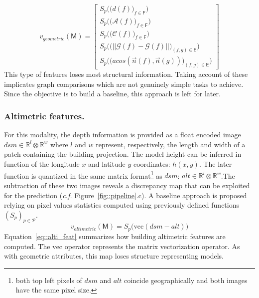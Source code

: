 \documentclass[runningheads]{llncs}
\begin{document}
\begin{equation}
	\label{eq::geom_feat}
    v_{geometric}(\mathsf{M}) = \begin{bmatrix}
    	S_p \Big(\big(d(f)\big)_{f \in \mathsf{F}}\Big)\\
    	S_p \Big(\big(\mathscr{A}(f)\big)_{f \in \mathsf{F}}\Big)\\
    	S_p \Big(\big(\mathscr{C}(f)\big)_{f \in \mathsf{F}}\Big)\\
    	S_p \Big(\big( \vert\vert \mathscr{G}(f) - \mathscr{G}(f) \vert\vert \big)_{(f,g) \in \mathsf{E}}\Big)\\
    	S_p \Big(\big( acos(\vec{n}(f), \vec{n}(g)) \big)_{(f,g) \in \mathsf{E}}\Big)
    \end{bmatrix}
\end{equation}
This type of features loses most structural information. Taking account of these implicates graph comparisons which are not genuinely simple tasks to achieve. Since the objective is to build a baseline, this approach is left for later.
\subsubsection{Altimetric features.}
For this modality, the depth information is provided as a float encoded image $dsm \in \mathbb{R}^l \otimes \mathbb{R}^w$ where $l$ and $w$ represent, respectively, the length and width of a patch containing the building projection. The model height can be inferred in function of the longitude $x$ and latitude $y$ coordinates: $h(x, y)$. The later function is quantized in the same matrix format\footnote{both top left pixels of $dsm$ and $alt$ coincide geographically and both images have the same pixel size.} as $dsm$: $alt \in \mathbb{R}^l \otimes \mathbb{R}^w$.The subtraction of these two images reveals a discrepancy map that can be exploited for the prediction (\textit{c.f.} Figure~\ref{fig::pipeline}.c). A baseline approach is proposed relying on pixel values statistics computed using previously defined functions $(S_p)_{p \in \mathscr{P}}$.
\begin{equation}
	\label{eq::alti_feat}
    v_{altimetric}(\mathsf{M}) = S_p\big( \mathrm{vec}(dsm - alt) \big)
\end{equation}
Equation~\ref{eq::alti_feat} summarizes how building altimetric features are computed. The $\mathrm{vec}$ operator represents the matrix vectorization operator. As with geometric attributes, this map loses structure representing models.
\end{document}
